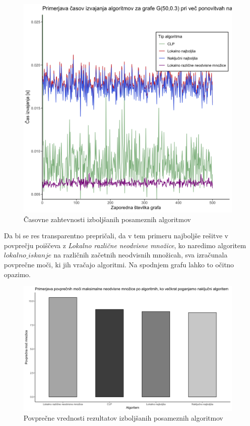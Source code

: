 \documentclass[a4paper, 12pt]{article}
\begin{document}
\begin{figure}[h!]
	\begin{center}
		\includegraphics[scale=0.12]{R_koda/pon-casi-maxi.png}
		\caption{Časovne zahtevnosti izboljšanih posameznih algoritmov}
	\end{center}
\end{figure}

\newpage
\noindent Da bi se res transparentno prepričali, da v tem primeru najboljše rešitve v povprečju poiščeva z \textit{Lokalno različne neodvisne množice}, ko naredimo algoritem $lokalno\_iskanje$
na različnih začetnih neodvisnih množicah, sva izračunala povprečne moči, ki jih vračajo algoritmi. Na spodnjem grafu lahko to očitno opazimo.
\begin{figure}[h!]
	\begin{center}
		\includegraphics[scale=0.11]{R_koda/pon-povpmoc-maxi.png}
		\caption{Povprečne vrednosti rezultatov izboljšanih posameznih algoritmov}
	\end{center}
\end{figure}
\end{document}
